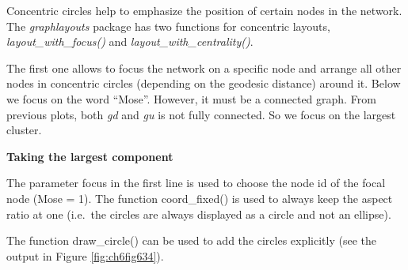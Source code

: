 \documentclass[
]{article}
\newenvironment{Shaded}{\begin{snugshade}}{\end{snugshade}}
\newcommand{\FunctionTok}[1]{\textcolor[rgb]{0.13,0.29,0.53}{\textbf{#1}}}
\newcommand{\NormalTok}[1]{#1}
\newcommand{\OtherTok}[1]{\textcolor[rgb]{0.56,0.35,0.01}{#1}}
\newcommand{\SpecialCharTok}[1]{\textcolor[rgb]{0.81,0.36,0.00}{\textbf{#1}}}
\begin{document}
Concentric circles help to emphasize the position of certain nodes in the network. The \emph{graphlayouts} package has two functions for concentric layouts, \emph{layout\_with\_focus()} and \emph{layout\_with\_centrality()}.

The first one allows to focus the network on a specific node and arrange all other nodes in concentric circles (depending on the geodesic distance) around it. Below we focus on the word ``Mose''. However, it must be a connected graph. From previous plots, both \emph{gd} and \emph{gu} is not fully connected. So we focus on the largest cluster.

\textbf{Taking the largest component}

\footnotesize

\begin{Shaded}
\end{Shaded}

\normalsize

The parameter focus in the first line is used to choose the node id of the focal node (Mose = 1). The function coord\_fixed() is used to always keep the aspect ratio at one (i.e.~the circles are always displayed as a circle and not an ellipse).

The function draw\_circle() can be used to add the circles explicitly (see the output in Figure \ref{fig:ch6fig634}).
\end{document}
